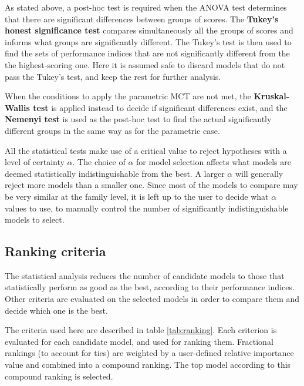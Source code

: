 As stated above, a post-hoc test is required when the ANOVA test determines that there are
significant differences between groups of scores. The {\bf Tukey's honest significance test} compares
simultaneously all the groups of scores and informs what groups are significantly different. The
Tukey's test is then used to find the sets of performance indices that are not significantly
different from the the highest-scoring one. Here it is assumed safe to discard models that do not
pass the Tukey's test, and keep the rest for further analysis.

When the conditions to apply the parametric MCT are not met, the {\bf Kruskal-Wallis test} is
applied instead to decide if significant differences exist, and the {\bf Nemenyi test} is used as
the post-hoc test to find the actual significantly different groups in the same way as for the
parametric case.

All the statistical tests make use of a critical value to reject hypotheses with a level of
certainty $\alpha$. The choice of $\alpha$ for model selection affects what models are deemed
statistically indistinguishable from the best. A larger $\alpha$ will generally reject more models
than a smaller one. Since most of the models to compare may be very similar at the family level,
it is left up to the user to decide what $\alpha$ values to use, to manually control the number of
significantly indistinguishable models to select.

\subsection{Ranking criteria}
The statistical analysis reduces the number of candidate models to those that statistically perform
as good as the best, according to their performance indices. Other criteria are evaluated on the
selected models in order to compare them and decide which one is the best.

The criteria used here are described in table \ref{tab:ranking}. Each criterion is evaluated for each
candidate model, and used for ranking them. Fractional rankings (to account for ties) are weighted by
a user-defined relative importance value and combined into a compound ranking. The top model
according to this compound ranking is selected.


